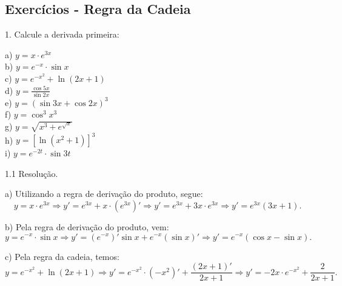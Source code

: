 \documentclass{article}
\begin{document}
{\begin{newpage}
\subsection{Exercícios - Regra da Cadeia}
\par
\vspace{0.3cm}
\begin{flushleft}
1. Calcule a derivada primeira:
\end{flushleft}
\par
\begin{multicols}{2}
\hspace{-15pt}a) $y=x\cdot e^{3x}$\\
b) $y=e^{-x}\cdot\sin{x} $\\
c) $y=e^{-x^{2}} + \ln{(2x+1)}$\\
d) $y=\displaystyle{\frac{\cos{5x}}{\sin{2x}}}$\\
e) $y=(\sin{3x} + \cos{2x})^3$\\
f) $y=\cos^{3}{x^3}$\\
g) $y=\sqrt{x^3 + e^{\sqrt{x}}}$\\
h) $y=[\ln{(x^2 + 1)}]^3$\\
i) $y=e^{-2t}\cdot\sin{3t}$\\
\end{multicols}
\par
\vspace{0.3cm}
\begin{flushleft}
1.1 Resolução.
\end{flushleft}
\par
a) Utilizando a regra de derivação do produto, segue: \begin{equation*}y=x\cdot e^{3x} \Rightarrow y'=e^{3x} + x\cdot (e^{3x})' \Rightarrow y'=e^{3x} + 3x\cdot e^{3x} \Rightarrow y'=e^{3x}(3x + 1).\end{equation*}
\par
\vspace{0.3cm}
b) Pela regra de derivação do produto, vem:
\begin{equation*} y=e^{-x}\cdot\sin{x} \Rightarrow y'=(e^{-x})'\sin{x} + e^{-x}(\sin{x})' \Rightarrow y'=e^{-x}(\cos{x} - \sin{x}).\end{equation*}
\par
\vspace{0.3cm}
c) Pela regra da cadeia, temos:
\begin{equation*} y=e^{-x^{2}} + \ln{(2x+1)} \Rightarrow y'=e^{-x^{2}}\cdot (-x^2)' + \displaystyle{\frac{(2x+1)'}{2x+1}} \Rightarrow y'=-2x\cdot e^{-x^{2}} + \displaystyle{\frac{2}{2x+1}}.\end{equation*}

\end{newpage}}
\end{document}
